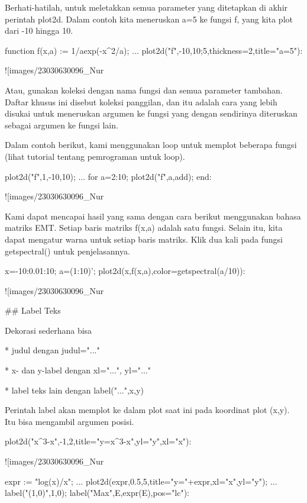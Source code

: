 \documentclass{article}
\begin{document}
Berhati-hatilah, untuk meletakkan semua parameter yang ditetapkan di
akhir perintah plot2d. Dalam contoh kita meneruskan a=5 ke fungsi f,
yang kita plot dari -10 hingga 10.


\>function f(x,a) := 1/a\*exp(-x^2/a); ...  
\>   plot2d("f",-10,10;5,thickness=2,title="a=5"):


![images/23030630096_Nur%

Atau, gunakan koleksi dengan nama fungsi dan semua parameter tambahan.
Daftar khusus ini disebut koleksi panggilan, dan itu adalah cara yang
lebih disukai untuk meneruskan argumen ke fungsi yang dengan
sendirinya diteruskan sebagai argumen ke fungsi lain.


Dalam contoh berikut, kami menggunakan loop untuk memplot beberapa
fungsi (lihat tutorial tentang pemrograman untuk loop).


\>plot2d({{"f",1}},-10,10); ...  
\>   for a=2:10; plot2d({{"f",a}},\>add); end:


![images/23030630096_Nur%

Kami dapat mencapai hasil yang sama dengan cara berikut menggunakan
bahasa matriks EMT. Setiap baris matriks f(x,a) adalah satu fungsi.
Selain itu, kita dapat mengatur warna untuk setiap baris matriks. Klik
dua kali pada fungsi getspectral() untuk penjelasannya.


\>x=-10:0.01:10; a=(1:10)'; plot2d(x,f(x,a),color=getspectral(a/10)):


![images/23030630096_Nur%

## Label Teks

Dekorasi sederhana bisa


* 
judul dengan judul="..."

* 
x- dan y-label dengan xl="...", yl="..."

* 
label teks lain dengan label("...",x,y)


Perintah label akan memplot ke dalam plot saat ini pada koordinat plot
(x,y). Itu bisa mengambil argumen posisi.


\>plot2d("x^3-x",-1,2,title="y=x^3-x",yl="y",xl="x"):


![images/23030630096_Nur%

\>expr := "log(x)/x"; ...  
\>     plot2d(expr,0.5,5,title="y="+expr,xl="x",yl="y"); ...  
\>     label("(1,0)",1,0); label("Max",E,expr(E),pos="lc"):
\end{document}
